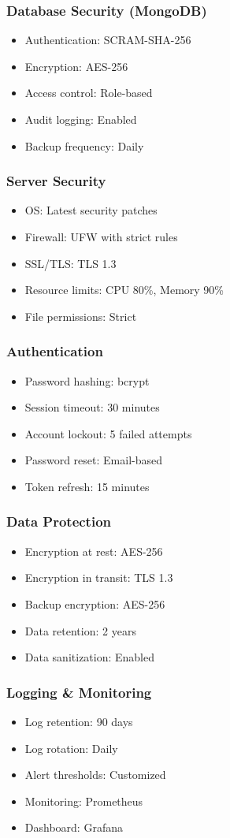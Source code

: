 \subsubsection{Database Security (MongoDB)}
\begin{itemize}
    \item Authentication: SCRAM-SHA-256
    \item Encryption: AES-256
    \item Access control: Role-based
    \item Audit logging: Enabled
    \item Backup frequency: Daily
\end{itemize}

\subsubsection{Server Security}
\begin{itemize}
    \item OS: Latest security patches
    \item Firewall: UFW with strict rules
    \item SSL/TLS: TLS 1.3
    \item Resource limits: CPU 80\%, Memory 90\%
    \item File permissions: Strict
\end{itemize}

\subsubsection{Authentication}
\begin{itemize}
    \item Password hashing: bcrypt
    \item Session timeout: 30 minutes
    \item Account lockout: 5 failed attempts
    \item Password reset: Email-based
    \item Token refresh: 15 minutes
\end{itemize}

\subsubsection{Data Protection}
\begin{itemize}
    \item Encryption at rest: AES-256
    \item Encryption in transit: TLS 1.3
    \item Backup encryption: AES-256
    \item Data retention: 2 years
    \item Data sanitization: Enabled
\end{itemize}

\subsubsection{Logging \& Monitoring}
\begin{itemize}
    \item Log retention: 90 days
    \item Log rotation: Daily
    \item Alert thresholds: Customized
    \item Monitoring: Prometheus
    \item Dashboard: Grafana
\end{itemize}
